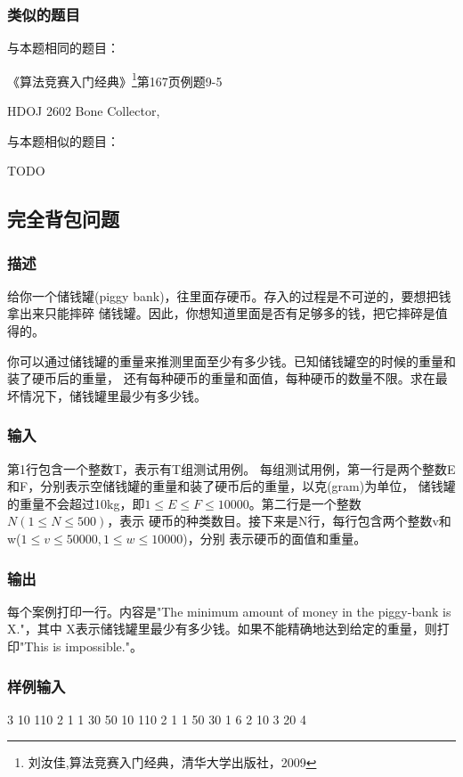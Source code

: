 \subsubsection{类似的题目}
与本题相同的题目：
\begindot
\item 《算法竞赛入门经典》\footnote{刘汝佳,算法竞赛入门经典，清华大学出版社，2009}第167页例题9-5
\item  HDOJ 2602 Bone Collector, 
\myenddot

与本题相似的题目：
\begindot
\item  TODO
\myenddot

\subsection{完全背包问题}

\subsubsection{描述}
给你一个储钱罐(piggy bank)，往里面存硬币。存入的过程是不可逆的，要想把钱拿出来只能摔碎
储钱罐。因此，你想知道里面是否有足够多的钱，把它摔碎是值得的。

你可以通过储钱罐的重量来推测里面至少有多少钱。已知储钱罐空的时候的重量和装了硬币后的重量，
还有每种硬币的重量和面值，每种硬币的数量不限。求在最坏情况下，储钱罐里最少有多少钱。

\subsubsection{输入}
第1行包含一个整数T，表示有T组测试用例。
每组测试用例，第一行是两个整数E和F，分别表示空储钱罐的重量和装了硬币后的重量，以克(gram)为单位，
储钱罐的重量不会超过10kg，即$1 \leq E \leq F \leq 10000$。第二行是一个整数$N(1 \leq N \leq 500)$，表示
硬币的种类数目。接下来是N行，每行包含两个整数v和w($1 \leq v \leq 50000, 1 \leq w \leq 10000$)，分别
表示硬币的面值和重量。

\subsubsection{输出}
每个案例打印一行。内容是"The minimum amount of money in the piggy-bank is X."，其中
X表示储钱罐里最少有多少钱。如果不能精确地达到给定的重量，则打印"This is impossible."。

\subsubsection{样例输入}
\begin{Code}
3
10 110
2
1 1
30 50
10 110
2
1 1
50 30
1 6
2
10 3
20 4
\end{Code}

